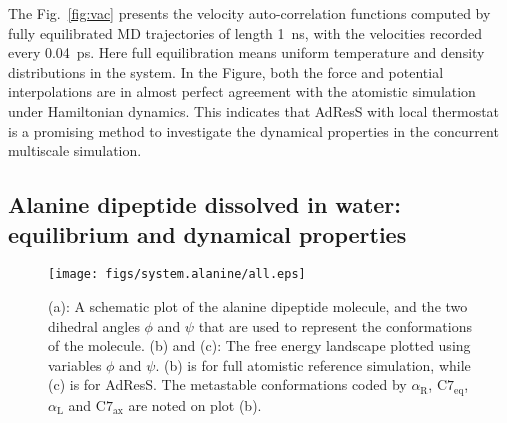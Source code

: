 \documentclass[epjST]{svjour}
\newcommand{\recheck}[1]{{\color{red} #1}}
\newcommand{\confa}[0]{{\alpha_{\textrm{R}}}}
\newcommand{\confb}[0]{{\textrm{C}7_{\textrm{eq}}}}
\newcommand{\confc}[0]{{\alpha_{\textrm{L}}}}
\newcommand{\confd}[0]{{\textrm{C}7_{\textrm{ax}}}}
\begin{document}
The Fig.~\ref{fig:vac} presents the velocity auto-correlation
functions computed by fully equilibrated MD trajectories of length 1~ns, with the
velocities recorded every 0.04~ps.  Here full equilibration means
uniform temperature and density distributions in the system.
In the Figure, both the force and potential interpolations are
in almost perfect agreement with the  atomistic simulation under Hamiltonian dynamics.
This indicates that AdResS with local thermostat
is a promising method to investigate the dynamical properties
in the concurrent multiscale simulation.




\subsection{Alanine dipeptide dissolved in water: equilibrium and dynamical properties}

\begin{figure}
  \centering
  \texttt{[image: figs/system.alanine/all.eps]}
  \caption{(a): A schematic plot of the alanine dipeptide molecule,
    and the two dihedral angles $\phi$ and $\psi$ that are used to
    represent the conformations of the molecule. (b) and (c): The free
    energy landscape plotted using variables $\phi$ and $\psi$.  (b)
    is for full atomistic reference simulation, while (c) is for
    AdResS. The metastable conformations coded by $\confa$, $\confb$, $\confc$ and $\confd$
    are noted on plot (b).}
  \label{fig:ala}
\end{figure}
\end{document}
